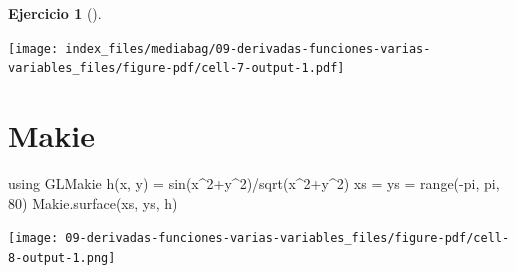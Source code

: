 \documentclass[
  a4paper,
]{scrreport}
\newenvironment{Shaded}{\begin{snugshade}}{\end{snugshade}}
\newcommand{\BuiltInTok}[1]{\textcolor[rgb]{0.00,0.23,0.31}{#1}}
\newcommand{\ConstantTok}[1]{\textcolor[rgb]{0.56,0.35,0.01}{#1}}
\newcommand{\FloatTok}[1]{\textcolor[rgb]{0.68,0.00,0.00}{#1}}
\newcommand{\FunctionTok}[1]{\textcolor[rgb]{0.28,0.35,0.67}{#1}}
\newcommand{\ImportTok}[1]{\textcolor[rgb]{0.00,0.46,0.62}{#1}}
\newcommand{\NormalTok}[1]{\textcolor[rgb]{0.00,0.23,0.31}{#1}}
\newcommand{\OperatorTok}[1]{\textcolor[rgb]{0.37,0.37,0.37}{#1}}
\theoremstyle{definition}
\newtheorem{exercise}{Ejercicio}[chapter]
\theoremstyle{remark}
\begin{document}
\begin{exercise}[]
\begin{enumerate}
\begin{tcolorbox}
  \texttt{[image: index\_files/mediabag/09-derivadas-funciones-varias-variables\_files/figure-pdf/cell-7-output-1.pdf]}

  \section{Makie}

\begin{Shaded}
\begin{Highlighting}[]
\ImportTok{using} \BuiltInTok{GLMakie}
\FunctionTok{h}\NormalTok{(x, y) }\OperatorTok{=} \FunctionTok{sin}\NormalTok{(x}\OperatorTok{\^{}}\FloatTok{2}\OperatorTok{+}\NormalTok{y}\OperatorTok{\^{}}\FloatTok{2}\NormalTok{)}\OperatorTok{/}\FunctionTok{sqrt}\NormalTok{(x}\OperatorTok{\^{}}\FloatTok{2}\OperatorTok{+}\NormalTok{y}\OperatorTok{\^{}}\FloatTok{2}\NormalTok{)}
\NormalTok{xs }\OperatorTok{=}\NormalTok{ ys }\OperatorTok{=} \FunctionTok{range}\NormalTok{(}\OperatorTok{{-}}\ConstantTok{pi}\NormalTok{, }\ConstantTok{pi}\NormalTok{, }\FloatTok{80}\NormalTok{)}
\NormalTok{Makie.}\FunctionTok{surface}\NormalTok{(xs, ys, h)}
\end{Highlighting}
\end{Shaded}

  \texttt{[image: 09-derivadas-funciones-varias-variables\_files/figure-pdf/cell-8-output-1.png]}

  \end{tcolorbox}
\end{enumerate}

\end{exercise}
\end{document}
